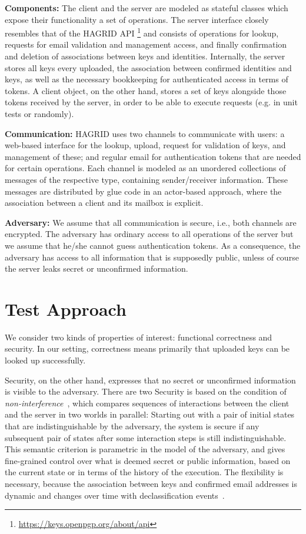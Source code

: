 \documentclass{llncs}
\begin{document}
\textbf{Components:} The client and the server are modeled as stateful classes which expose their functionality a set of operations.
The server interface closely resembles that of the HAGRID API%
    \footnote{\url{https://keys.openpgp.org/about/api}}
and consists of operations for lookup, requests for email validation and management access,
and finally confirmation and deletion of associations between keys and identities.
Internally, the server stores all keys every uploaded, the association between confirmed identities and keys,
as well as the necessary bookkeeping for authenticated access in terms of tokens.
A client object, on the other hand, stores a set of keys alongside those tokens received by the server, in order to be able to execute requests (e.g. in unit tests or randomly).

\textbf{Communication:} HAGRID uses two channels to communicate with users:
a web-based interface for the lookup, upload, request for validation of keys, and management of these;
and regular email for authentication tokens that are needed for certain operations.
Each channel is modeled as an unordered collections of messages of the respective type, containing sender/receiver information.
These messages are distributed by glue code in an actor-based approach,
where the association between a client and its mailbox is explicit.

\textbf{Adversary:} We assume that all communication is secure, i.e., both channels are encrypted.
The adversary has ordinary access to all operations of the server but we assume that he/she cannot guess authentication tokens.
As a consequence, the adversary has access to all information that is supposedly public,
unless of course the server leaks secret or unconfirmed information.

\section{Test Approach}

We consider two kinds of properties of interest: functional correctness and security.
In our setting, correctness means primarily that uploaded keys can be looked up successfully.

Security, on the other hand, expresses that no secret or unconfirmed information is visible to the adversary.
There are two 
Security is based on the condition of \emph{non-interference}~\cite{},
which compares sequences of interactions between the client and the server in two worlds in parallel:
Starting out with a pair of initial states that are indistinguishable by the adversary,
the system is secure if any subsequent pair of states after some interaction steps is still indistinguishable.
This semantic criterion is parametric in the model of the adversary, and gives fine-grained control over what is deemed secret or public information, based on the current state or in terms of the history of the execution.
The flexibility is necessary, because the association between keys and confirmed email addresses is dynamic and changes over time with declassification events~\cite{}.
\end{document}
